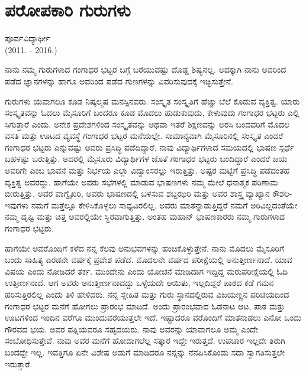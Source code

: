 \chapter{ಪರೋಪಕಾರಿ ಗುರುಗಳು}

\begin{center}
\smallskip
ಪೂರ್ವವಿದ್ಯಾರ್ಥೀ\\
(2011. - 2016.)
\end{center}
ನಾನು ನಮ್ಮ ಗುರುಗಳಾದ ಗಂಗಾಧರ ಭಟ್ಟರ ಬಗ್ಗೆ ಬರೆಯುವಷ್ಟು ದೊಡ್ಡ ಶಿಷ್ಯನಲ್ಲ. ಅದಕ್ಕಾಗಿ ನಾನು ಅವರಿಂದ ಪಡೆದ ಜ್ಞಾನಗಳನ್ನು ಹಾಗೂ ಅವರಿಂದ ಪಡೆದ ಗುಣಗಳನ್ನು ವಿವರಿಸುವುದಕ್ಕೆ ಇಚ್ಛಿಸುತ್ತೇನೆ.

ಗುರುಗಳು ಯವಾಗಲೂ ಕೂಡ ನಿಷ್ಕಲ್ಮಷ ಮನಸ್ಸಿನವರು. ಸಂಸ್ಕೃತ ಸಂಸ್ಕೃತಿಗೆ ಹೆಚ್ಚು ಬೆಲೆ ಕೊಡುವ ವ್ಯಕ್ತಿತ್ವ. ಯಾರು ಸಂಸ್ಕೃತವನ್ನು ಓದಲು ಮೈಸೂರಿಗೆ ಬಂದರೂ ಕೂಡ ಮೊದಲು ಹುಡುಕುವುದು, ಕೇಳುವುದು ಗಂಗಾಧರ ಭಟ್ಟರು ಎಲ್ಲಿ ಸಿಗುತ್ತಾರೆ ಎಂದು. ಅನೇಕ ಪ್ರದೇಶಗಳಿಂದ ಸಂಸ್ಕೃತವನ್ನು ಅಥವಾ ಇತರೆ ಶಿಕ್ಷಣವನ್ನು ಅರಸಿ ಬಂದವರಿಗೆ ಮೊದಲ ವಸತಿ ಮತ್ತು ಊಟದ ವ್ಯವಸ್ಥೆ ಗಂಗಾಧರ ಭಟ್ಟರ ಮನೆಯಲ್ಲೇ. ಸಾಮಾನ್ಯವಾಗಿ ಮೈಸೂರಿನಲ್ಲಿ ಸಂಸ್ಕೃತ ಎಂದರೆ ಗಂಗಾಧರ ಭಟ್ಟರು ಎನ್ನುವಷ್ಟು ಅವರು ಪ್ರಸಿದ್ಧಿ ಪಡೆದಿದ್ದಾರೆ. ನಾವು ವಿದ್ಯಾರ್ಥಿಗಳಾದ ಸಮಯದಲ್ಲಿ ಭಾಷಣ ಸ್ಪರ್ಧೆ ಬಹಳಷ್ಟು ಬರುತ್ತಿತ್ತು. ಅದರಲ್ಲಿ ಮೈಸೂರು ವಿದ್ಯಾರ್ಥಿಗಳ ಜೊತೆ ಗಂಗಾಧರ ಭಟ್ಟರು ಬಂದಿದ್ದಾರೆ ಎಂದರೆ ಜಯ ಅವರಿಗೇ ಎಂಬ ಭಾವನೆ ಮತ್ತು ನಿರ್ಭಯ ಎಲ್ಲಾ ವಿದ್ವಾಂಸರಲ್ಲು ಇರುತ್ತಿತ್ತು. ಅಷ್ಟರ ಮಟ್ಟಿಗೆ ಪ್ರಸಿದ್ಧಿ ಪಡೆದಂತಹ ವ್ಯಕ್ತಿತ್ವ ಅವರದ್ದು. ಹಾಗೆಯೇ ಅವರು ಸಭೆಗಳಲ್ಲಿ ಮಾಡುವ ಭಾಷಣಗಳು ನಮ್ಮ ಮೇಲೆ ಧನಾತ್ಮಕ ಪರಿಣಾಮ ಬೀರುತ್ತಿತ್ತು. ಅವರ ವಾಗ್ವೈಖರಿ, ಅವರು ಭಾಷಣದಲ್ಲಿ ಬಳಸುವ ಶಬ್ದಝರಿ ಮತ್ತು ಅವರ ಶಾಸ್ತ್ರ ವ್ಯಾಖ್ಯಾನ ಕೌಶಲ- ಇವುಗಳು ನಮಗೆ ಮತ್ತೆಲ್ಲೂ ಕೇಳಿಸಿಕೊಳ್ಳಲು ಸಾಧ್ಯವಿರಲಿಲ್ಲ. ಅವರು ಮಾತನ್ನಾಡುತ್ತಿದ್ದರೆ ನಮಗೆ ಅರಿವಿಲ್ಲದಂತೆಯೇ ನಮ್ಮ ದೃಷ್ಟಿ ಮತ್ತು ಚಿತ್ತ ಅವರಲ್ಲಿಯೇ ಸ್ಥಿರವಾಗುತ್ತಿತ್ತು. ಅಂತಹ ಮಹಾನ್ ಭಾಷಣಕಾರರು ನಮ್ಮ ಗುರುಗಳಾದ ಗಂಗಾಧರ ಭಟ್ಟರು.
	
ಹಾಗೆಯೇ ಅವರೊಂದಿಗೆ ಕಳೆದ ನನ್ನ ಕೆಲವು ಅನುಭವಗಳನ್ನು ಹಂಚಿಕೊಳ್ಳುತ್ತೇನೆ. ನಾನು ಮೊದಲು ಮೈಸೂರಿಗೆ ಬಂದು ಸಾಹಿತ್ಯ ಎರಡನೇ ವರ್ಷಕ್ಕೆ ಪ್ರವೇಶ ಪಡೆದೆ. ಮೊದಲನೇ ವರ್ಷದ ಪರೀಕ್ಷೆಯಲ್ಲಿ ಅನುತ್ತೀರ್ಣನಾದೆ. ಯಾವ ವಿಷಯ ಎಂದು ನೋಡಿದರೆ ತರ್ಕ. ಮುಂದೇನು ಎಂದು ಯೋಚನೆ ಮಾಡಿದಾಗ ಇದ್ದಿದ್ದ ಮರುಪರೀಕ್ಷೆಯಲ್ಲಿ ಓದಿ ಉತ್ತೀರ್ಣನಾದೆ. ಆಗ ಅವರು ಅನುತ್ತೀರ್ಣನಾದದ್ದು ಒಳ್ಳೆಯದೇ ಆಯಿತು, ಇಲ್ಲದಿದ್ದರೆ ಪಾಠದ ಕಡೆ ಗಮನ ಹರಿಸುತ್ತಿರಲಿಲ್ಲ ಎಂದು ತಿಳಿ ಹೇಳಿದರು. ನನ್ನ ಸ್ನೇಹಿತ ಮತ್ತು ಗುರು ಸ್ಥಾನದಲ್ಲಿರುವ ವಿಜಯಣ್ಣನ ಪರಿಚಯದಿಂದ ಗಂಗಾಧರ ಭಟ್ಟರ ಮನೆಗೆ ಹೋಗಲು ಪ್ರಾರಂಭ ಮಾಡಿದೆ. ಅಂದು ಪ್ರಾರಂಭವಾದ ಓಡನಾಟ ಆಟ, ಪಾಠ ಮತ್ತು ಊಟಗಳಿಂದ ಇಂದಿನ ವರೆಗೂ ಮುಂದುವರೆಯುತ್ತಲೇ ಇದೆ. ಇಷ್ಟಾದರೂ ವರೊಂದಿಗೆ ಮಾತನಾಡಲು ಎನೋ ಒಂದು ಗೌರವದ ಭಯ. ಅವರ ಪತ್ನಿಯವರೂ ಸಹೃದಯರು. ನಾವು ಅವರನ್ನು ಯಾವಾಗಲೂ ಅಮ್ಮ ಎಂದೇ ಸಂಬೋಧಿಸುತ್ತೇವೆ. ನಾವು ಅವರ ಮನೆಗೆ ಹೋದಾಗಲೆಲ್ಲ ಸತ್ಕಾರ ಇದ್ದೇ ಇರುತ್ತದೆ. ಉಪಚಾರ ಇಲ್ಲದೇ ತಿರುಗಿ ಬಂದದ್ದೇ ಇಲ್ಲ. ಇವತ್ತಿಗೂ ಏನೇ ವಿಶೇಷ ಅಡುಗೆ ಮಾಡಿದರೂ ನನ್ನನ್ನು ನೆನಪಿಸಿಕೊಂಡು ಸದಾ ಸ್ವಾಗತಿಸುತ್ತಲೇ ಇರುತ್ತಾರೆ.
	
